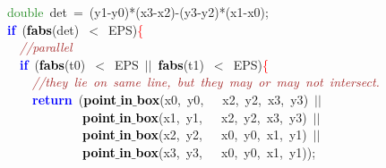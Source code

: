 {{\mbox{}\ \ \textcolor{ForestGreen}{double}\ det\ \textcolor{BrickRed}{=}\ \textcolor{BrickRed}{(}y1\textcolor{BrickRed}{-}y0\textcolor{BrickRed}{)*(}x3\textcolor{BrickRed}{-}x2\textcolor{BrickRed}{)-(}y3\textcolor{BrickRed}{-}y2\textcolor{BrickRed}{)*(}x1\textcolor{BrickRed}{-}x0\textcolor{BrickRed}{);} \\
\mbox{}\ \ \textbf{\textcolor{Blue}{if}}\ \textcolor{BrickRed}{(}\textbf{\textcolor{Black}{fabs}}\textcolor{BrickRed}{(}det\textcolor{BrickRed}{)}\ \textcolor{BrickRed}{$<$}\ EPS\textcolor{BrickRed}{)}\textcolor{Red}{\{} \\
\mbox{}\ \ \ \ \textit{\textcolor{Brown}{//parallel}} \\
\mbox{}\ \ \ \ \textbf{\textcolor{Blue}{if}}\ \textcolor{BrickRed}{(}\textbf{\textcolor{Black}{fabs}}\textcolor{BrickRed}{(}t0\textcolor{BrickRed}{)}\ \textcolor{BrickRed}{$<$}\ EPS\ \textcolor{BrickRed}{$|$$|$}\ \textbf{\textcolor{Black}{fabs}}\textcolor{BrickRed}{(}t1\textcolor{BrickRed}{)}\ \textcolor{BrickRed}{$<$}\ EPS\textcolor{BrickRed}{)}\textcolor{Red}{\{} \\
\mbox{}\ \ \ \ \ \ \textit{\textcolor{Brown}{//they\ lie\ on\ same\ line,\ but\ they\ may\ or\ may\ not\ intersect.}} \\
\mbox{}\ \ \ \ \ \ \textbf{\textcolor{Blue}{return}}\ \textcolor{BrickRed}{(}\textbf{\textcolor{Black}{point$\_$in$\_$box}}\textcolor{BrickRed}{(}x0\textcolor{BrickRed}{,}\ y0\textcolor{BrickRed}{,}\ \ \ x2\textcolor{BrickRed}{,}\ y2\textcolor{BrickRed}{,}\ x3\textcolor{BrickRed}{,}\ y3\textcolor{BrickRed}{)}\ \textcolor{BrickRed}{$|$$|$} \\
\mbox{}\ \ \ \ \ \ \ \ \ \ \ \ \ \ \textbf{\textcolor{Black}{point$\_$in$\_$box}}\textcolor{BrickRed}{(}x1\textcolor{BrickRed}{,}\ y1\textcolor{BrickRed}{,}\ \ \ x2\textcolor{BrickRed}{,}\ y2\textcolor{BrickRed}{,}\ x3\textcolor{BrickRed}{,}\ y3\textcolor{BrickRed}{)}\ \textcolor{BrickRed}{$|$$|$} \\
\mbox{}\ \ \ \ \ \ \ \ \ \ \ \ \ \ \textbf{\textcolor{Black}{point$\_$in$\_$box}}\textcolor{BrickRed}{(}x2\textcolor{BrickRed}{,}\ y2\textcolor{BrickRed}{,}\ \ \ x0\textcolor{BrickRed}{,}\ y0\textcolor{BrickRed}{,}\ x1\textcolor{BrickRed}{,}\ y1\textcolor{BrickRed}{)}\ \textcolor{BrickRed}{$|$$|$} \\
\mbox{}\ \ \ \ \ \ \ \ \ \ \ \ \ \ \textbf{\textcolor{Black}{point$\_$in$\_$box}}\textcolor{BrickRed}{(}x3\textcolor{BrickRed}{,}\ y3\textcolor{BrickRed}{,}\ \ \ x0\textcolor{BrickRed}{,}\ y0\textcolor{BrickRed}{,}\ x1\textcolor{BrickRed}{,}\ y1\textcolor{BrickRed}{));} \\
}}
